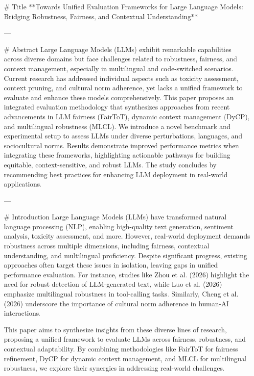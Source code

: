 # Title  
**Towards Unified Evaluation Frameworks for Large Language Models: Bridging Robustness, Fairness, and Contextual Understanding**

---

# Abstract  
Large Language Models (LLMs) exhibit remarkable capabilities across diverse domains but face challenges related to robustness, fairness, and context management, especially in multilingual and code-switched scenarios. Current research has addressed individual aspects such as toxicity assessment, context pruning, and cultural norm adherence, yet lacks a unified framework to evaluate and enhance these models comprehensively. This paper proposes an integrated evaluation methodology that synthesizes approaches from recent advancements in LLM fairness (FairToT), dynamic context management (DyCP), and multilingual robustness (MLCL). We introduce a novel benchmark and experimental setup to assess LLMs under diverse perturbations, languages, and sociocultural norms. Results demonstrate improved performance metrics when integrating these frameworks, highlighting actionable pathways for building equitable, context-sensitive, and robust LLMs. The study concludes by recommending best practices for enhancing LLM deployment in real-world applications.

---

# Introduction  
Large Language Models (LLMs) have transformed natural language processing (NLP), enabling high-quality text generation, sentiment analysis, toxicity assessment, and more. However, real-world deployment demands robustness across multiple dimensions, including fairness, contextual understanding, and multilingual proficiency. Despite significant progress, existing approaches often target these issues in isolation, leaving gaps in unified performance evaluation. For instance, studies like Zhou et al. (2026) highlight the need for robust detection of LLM-generated text, while Luo et al. (2026) emphasize multilingual robustness in tool-calling tasks. Similarly, Cheng et al. (2026) underscore the importance of cultural norm adherence in human-AI interactions.

This paper aims to synthesize insights from these diverse lines of research, proposing a unified framework to evaluate LLMs across fairness, robustness, and contextual adaptability. By combining methodologies like FairToT for fairness refinement, DyCP for dynamic context management, and MLCL for multilingual robustness, we explore their synergies in addressing real-world challenges.

